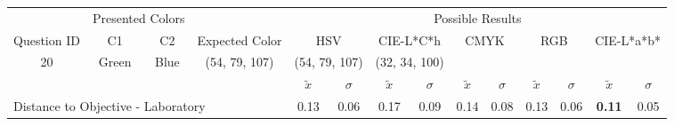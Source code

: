 %
\begin{table}[!htbp]
  \resizebox{\textwidth}{!} {
  \begin{tabular}{lccccccccccccc}
    \hline
    \multicolumn{1}{c}{}                              & \multicolumn{2}{c}{Presented Colors}             &                                                            & \multicolumn{10}{c}{Possible Results}                                                                                                                                                                                                                                                                       \\ \cline{2-3} \cline{5-14}
    \multicolumn{1}{c}{\multirow{-2}{*}{Question ID}} & C1                   & C2                        & \multirow{-2}{*}{Expected Color}                           & \multicolumn{2}{c}{HSV}                                    & \multicolumn{2}{c}{CIE-L*C*h}                              & \multicolumn{2}{c}{CMYK}                                  & \multicolumn{2}{c}{RGB}                                   & \multicolumn{2}{c}{CIE-L*a*b*}                            \\ \hline
    \multicolumn{1}{c|}{20}                           & Green                & \multicolumn{1}{c|}{Blue} & \multicolumn{1}{c|}{\cellcolor[HTML]{00FFFF}(54, 79, 107)} & \multicolumn{2}{c|}{\cellcolor[HTML]{00FFFF}(54, 79, 107)} & \multicolumn{2}{c|}{\cellcolor[HTML]{00A5FF}(32, 34, 100)} & \multicolumn{2}{c|}{\cellcolor[HTML]{008080}{\color[HTML]{FFFFFF}(12, 17, 23)}} & \multicolumn{2}{c|}{\cellcolor[HTML]{008080}{\color[HTML]{FFFFFF}(12, 17, 23)}} & \multicolumn{2}{c|}{\cellcolor[HTML]{7D93A6}{\color[HTML]{FFFFFF}(26, 28, 40)}} \\ \hline
                                                      & \multicolumn{1}{l}{} & \multicolumn{1}{l}{}      & \multicolumn{1}{l}{}                                       & $\tilde{x}$           & $\sigma$                           & $\tilde{x}$           & $\sigma$                           & $\tilde{x}$          & $\sigma$                           & $\tilde{x}$          & $\sigma$                           & $\tilde{x}$           & $\sigma$                          \\ \hline
    \multicolumn{4}{l|}{Distance to Objective - Laboratory}                                                                                                            & 0.13                  & \multicolumn{1}{c|}{0.06}          & 0.17                  & \multicolumn{1}{c|}{0.09}          & 0.14                 & \multicolumn{1}{c|}{0.08}          & 0.13                 & \multicolumn{1}{c|}{0.06}          & \textbf{0.11}         & \multicolumn{1}{c|}{0.05}         \\

\end{tabular}}
\end{table}

